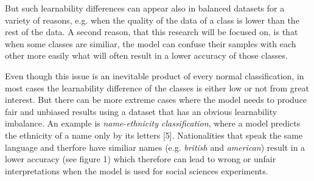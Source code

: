 \documentclass[journal]{IEEEtran}
\begin{document}

But such learnability differences can appear also in balanced datasets for a variety of reasons, e.g. when the quality of the data of a class is lower than the rest of the data. 
A second reason, that this research will be focused on, is that when some classes are similiar, %
the model can confuse their samples with each other more easily what will often result in a lower accuracy of those classes.

Even though this issue is an inevitable product of every normal classification, in most cases the learnability difference of the classes is either low or not from great interest.
But there can be more extreme cases where the model needs to produce fair and unbiased results using a dataset that has an obvious learnability imbalance. 
An example is \emph{name-ethnicity classification}, where a model predicts the ethnicity of a name only by its letters [5]. 
Nationalities that speak the same language and therfore have similiar names (e.g. \emph{british} and \emph{american}) result in a lower accuracy (see figure 1) which therefore can lead to wrong or unfair interpretations when the model is used for social sciences experiments. 
\end{document}
